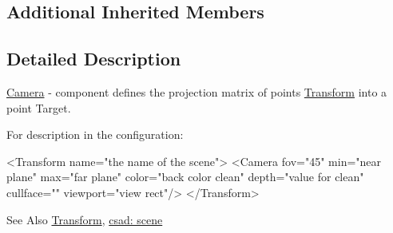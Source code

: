 \subsection*{Additional Inherited Members}


\subsection{Detailed Description}
\hyperlink{classcsad_1_1_camera}{Camera} -\/ component defines the projection matrix of points \hyperlink{classcsad_1_1_transform}{Transform} into a point Target. 

For description in the configuration\-: \begin{DoxyVerb}  <Transform name="the name of the scene">
      <Camera fov="45" min="near plane" max="far plane" color="back color clean" depth="value for clean" cullface="" viewport="view rect"/>
  </Transform>
\end{DoxyVerb}


\begin{DoxySeeAlso}{See Also}
\hyperlink{classcsad_1_1_transform}{Transform}, \hyperlink{group__scene}{csad\-: scene} 
\end{DoxySeeAlso}
